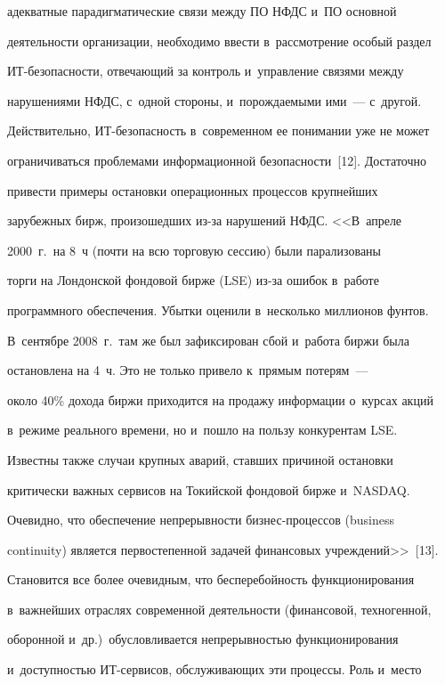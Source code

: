 адекватные парадигматические связи между ПО НФДС и~ПО основной


деятельности организации, необходимо ввести в~рассмотрение особый раздел


ИТ-безопас\-ности, отвечающий за контроль и~управление связями между


нарушениями НФДС, с~одной стороны, и~порождаемыми ими~--- с~другой.





  Действительно, ИТ-безопасность в~современном ее понимании уже не может


ограничиваться проблемами информационной безопасности~[12]. Достаточно


привести примеры остановки операционных процессов крупнейших


зарубежных бирж, произошедших из-за нарушений НФДС. <<В~апреле


2000~г.\ на 8~ч (почти на всю торговую сессию) были парализованы


торги на Лондонской фондовой бирже (LSE) из-за ошибок в~работе


программного обеспечения. Убытки оценили в~несколько миллионов фунтов.


В~сентябре 2008~г.\ там же был зафиксирован сбой и~работа биржи была


остановлена на 4~ч. Это не только привело к~прямым потерям~---


около 40\% дохода биржи приходится на продажу информации о~курсах акций


в~режиме реального времени, но и~пошло на пользу конкурентам LSE.


Известны также случаи крупных аварий, ставших причиной остановки


критически важных сервисов на Токийской фондовой бирже и~NASDAQ.


Очевидно, что обеспечение непрерывности биз\-нес-про\-цес\-сов (business


continuity) является первостепенной задачей финансовых учреждений>>~[13].


Становится все более очевидным, что бесперебойность функционирования


в~важнейших отраслях современной деятельности (финансовой, техногенной,


оборонной и~др.)\ обусловливается непрерывностью функционирования


и~доступностью ИТ-сер\-ви\-сов, обслуживающих эти процессы. Роль и~место


